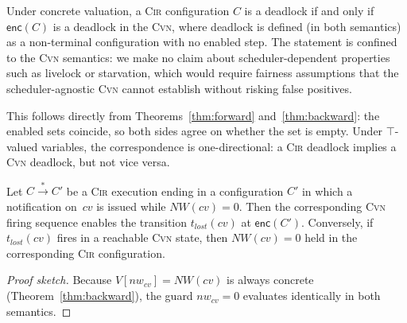 \begin{theorem}
\label{thm:deadlock-corr}
Under concrete valuation, a \textsc{Cir} configuration $C$ is a
deadlock if and only if $\mathsf{enc}(C)$ is a deadlock in the
\textsc{Cvn}, where deadlock is defined (in both semantics) as a
non-terminal configuration with no enabled step. The statement is
confined to the \textsc{Cvn} semantics: we make no claim about
scheduler-dependent properties such as livelock or starvation, which
would require fairness assumptions that the scheduler-agnostic
\textsc{Cvn} cannot establish without risking false positives.
\end{theorem}

This follows directly from Theorems~\ref{thm:forward}
and~\ref{thm:backward}: the enabled sets coincide, so both sides agree on whether the set is empty. Under $\top$-valued variables, the correspondence is one-directional: a \textsc{Cir} deadlock implies a \textsc{Cvn} deadlock, but not vice versa.

\begin{proposition}
\label{prop:signal-loss}
Let $C\xrightarrow{*}C'$ be a \textsc{Cir} execution ending in a
configuration $C'$ in which a notification on~$cv$ is issued while
$\mathit{NW}(cv)=0$. Then the corresponding \textsc{Cvn} firing
sequence enables the transition $t_{\mathit{lost}}(cv)$ at
$\mathsf{enc}(C')$. Conversely, if $t_{\mathit{lost}}(cv)$ fires in a
reachable \textsc{Cvn} state, then $\mathit{NW}(cv)=0$ held in the
corresponding \textsc{Cir} configuration.
\end{proposition}

\begin{proof}[Proof sketch]
Because $V[\mathit{nw}_{\mathit{cv}}]=\mathit{NW}(\mathit{cv})$ is
always concrete (Theorem~\ref{thm:backward}), the guard
$\mathit{nw}_{\mathit{cv}}=0$ evaluates identically in both
semantics.
\end{proof}

